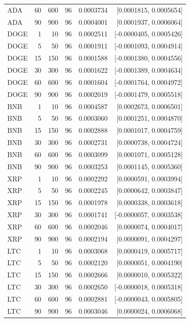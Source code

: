 \documentclass[10pt]{article}
\begin{document}
\begin{longtable}{lrrrrr}
ADA & 60 & 600 & 96 & 0.0003734 & [0.0001815, 0.0005654] \\
ADA & 90 & 900 & 96 & 0.0004001 & [0.0001937, 0.0006064] \\
DOGE & 1 & 10 & 96 & 0.0002511 & [-0.0000405, 0.0005426] \\
DOGE & 5 & 50 & 96 & 0.0001911 & [-0.0001093, 0.0004914] \\
DOGE & 15 & 150 & 96 & 0.0001588 & [-0.0001380, 0.0004556] \\
DOGE & 30 & 300 & 96 & 0.0001622 & [-0.0001389, 0.0004634] \\
DOGE & 60 & 600 & 96 & 0.0001604 & [-0.0001764, 0.0004972] \\
DOGE & 90 & 900 & 96 & 0.0002019 & [-0.0001479, 0.0005518] \\
BNB & 1 & 10 & 96 & 0.0004587 & [0.0002673, 0.0006501] \\
BNB & 5 & 50 & 96 & 0.0003060 & [0.0001251, 0.0004870] \\
BNB & 15 & 150 & 96 & 0.0002888 & [0.0001017, 0.0004759] \\
BNB & 30 & 300 & 96 & 0.0002731 & [0.0000738, 0.0004724] \\
BNB & 60 & 600 & 96 & 0.0003099 & [0.0001071, 0.0005128] \\
BNB & 90 & 900 & 96 & 0.0003253 & [0.0001145, 0.0005360] \\
XRP & 1 & 10 & 96 & 0.0002292 & [0.0000591, 0.0003994] \\
XRP & 5 & 50 & 96 & 0.0002245 & [0.0000642, 0.0003847] \\
XRP & 15 & 150 & 96 & 0.0001978 & [0.0000338, 0.0003618] \\
XRP & 30 & 300 & 96 & 0.0001741 & [-0.0000057, 0.0003538] \\
XRP & 60 & 600 & 96 & 0.0002046 & [0.0000074, 0.0004017] \\
XRP & 90 & 900 & 96 & 0.0002194 & [0.0000091, 0.0004297] \\
LTC & 1 & 10 & 96 & 0.0003068 & [0.0000419, 0.0005717] \\
LTC & 5 & 50 & 96 & 0.0002120 & [0.0000051, 0.0004190] \\
LTC & 15 & 150 & 96 & 0.0002666 & [0.0000010, 0.0005322] \\
LTC & 30 & 300 & 96 & 0.0002650 & [-0.0000018, 0.0005318] \\
LTC & 60 & 600 & 96 & 0.0002881 & [-0.0000043, 0.0005805] \\
LTC & 90 & 900 & 96 & 0.0003046 & [0.0000024, 0.0006068] \\
\bottomrule\end{longtable}\normalsize
\end{document}
